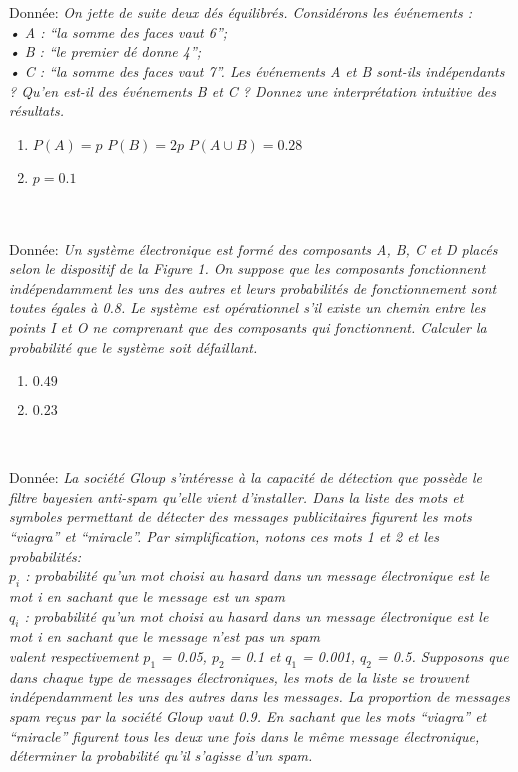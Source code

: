 \documentclass[11pt,a4paper]{report}
\newcounter{num}
\newcommand{\exo}{\addtocounter{num}{1}\noindent{\bf{Exercice \thenum}}\\[-1mm]}
\newcommand{\donnee}[1]{\\{Donnée: } \emph{#1}}
\begin{document}
%
%
\exo
\donnee{On jette de suite deux dés équilibrés. Considérons les événements :
	\\• A : “la somme des faces vaut 6”;
	\\• B : “le premier dé donne 4”;
	\\• C : “la somme des faces vaut 7”.
	Les événements A et B sont-ils indépendants ? Qu’en est-il des événements B et C ? Donnez une interprétation intuitive des résultats.}
\begin{enumerate}[label=\alph*), parsep=0cm, itemsep=3mm, topsep=3mm]
	\item $P(A) = p$ \hspace{5mm} $P(B) = 2p$ \hspace{5mm} $P(A \cup B) = 0.28$
	\item $p = 0.1$
\end{enumerate}
\vspace{1mm}

%
%
\exo
\donnee{Un système électronique est formé des composants A, B, C et D placés selon le dispositif de la Figure 1. On suppose que les composants fonctionnent indépendamment les uns des autres et leurs probabilités de fonctionnement sont toutes égales à 0.8. Le système est opérationnel s’il existe un chemin entre les points I et O ne comprenant que des composants qui fonctionnent. Calculer la probabilité que le système soit défaillant.}
\begin{enumerate}[label=\alph*), parsep=0cm, itemsep=3mm, topsep=5mm]
\item $0.49$
\item $0.23$
\end{enumerate}

%
%
\exo
\donnee{La société Gloup s’intéresse à la capacité de détection que possède le filtre bayesien anti-spam qu’elle vient d’installer. Dans la liste des mots et symboles permettant de détecter des messages publicitaires figurent les mots “viagra” et “miracle”. Par simplification, notons ces mots 1 et 2 et les probabilités:
	\\\indent$p_i$ : probabilité qu’un mot choisi au hasard dans un message électronique est le mot i en sachant que le message est un spam
	\\\indent$q_i$ : probabilité qu'un mot choisi au hasard dans un message électronique est le mot i en sachant que le message n’est pas un spam
	\\valent respectivement $p_1$ = 0.05, $p_2$ = 0.1 et $q_1$ = 0.001, $q_2$ = 0.5. Supposons que dans chaque type de messages électroniques, les mots de la liste se trouvent indépendamment les uns des autres dans les messages. La proportion de messages spam reçus par la société Gloup vaut 0.9. En sachant que les mots “viagra” et “miracle” figurent tous les deux une fois dans le même message électronique, déterminer la probabilité qu’il s’agisse d’un spam.}
\end{document}
